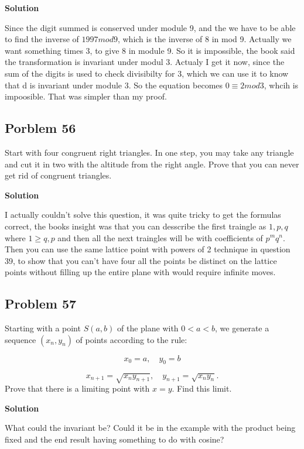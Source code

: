 \documentclass[12pt,tikz,border=10pt]{article}
\theoremstyle{definition}
\theoremstyle{remark}
\begin{document}
\textbf{Solution}

Since the digit summed is conserved under module 9, and the we have to be able to find the inverse of 
$1997 mod 9$, which is the inverse of $8$ in mod 9. Actually we want something times 3, to give 8 in module 9.
So it is impossible, the book said the transformation is invariant under modul 3.
Actualy I get it now, since the sum of the digits is used to check divisibilty for 3, which we can use it to 
know that d is invariant under module 3. So the equation becomes $0\equiv 2 mod 3$, whcih is impoosible. 
That was simpler than my proof.

\subsection{Porblem 56}


Start with four congruent right triangles. In one step, you may take any triangle and cut it in two with the altitude from the right angle. Prove that you can never get rid of congruent triangles.


\textbf{Solution}

I actually couldn't solve this question, it was quite tricky to get the formulas correct, the books insight was 
that you can desscribe the first traingle as $1,p,q$ where $1 \geq q, p$ and then all the next traingles will be 
with coefficients of $p^m q^n$. Then you can use the same lattice point with powers of 2 technique in question 39, 
to show that you can't have four all the points be distinct on the lattice points without filling up the entire plane with would require infinite moves.

\subsection{Problem 57}

Starting with a point \( S(a, b) \) of the plane with \( 0 < a < b \), we generate a sequence \( (x_n, y_n) \) of points according to the rule:

\[
x_0 = a, \quad y_0 = b
\]

\[
x_{n+1} = \sqrt{x_n y_{n+1}}, \quad y_{n+1} = \sqrt{x_n y_n}.
\]
Prove that there is a limiting point with $x=y$. Find this limit.


\textbf{Solution}

What could the invariant be? Could it be in the example with the product being fixed and the end result 
having something to do with cosine?
\end{document}
